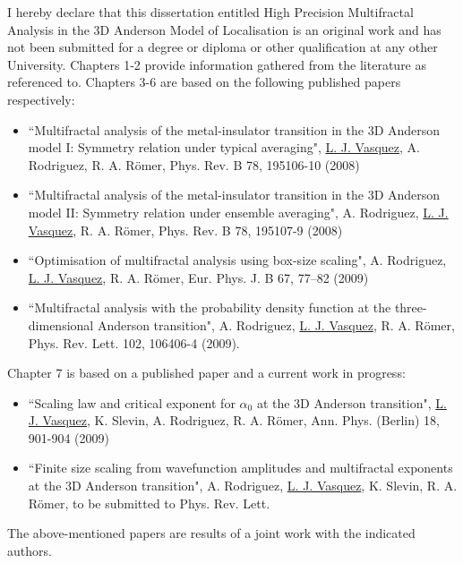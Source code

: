 \begin{singlespacing}
 
I hereby declare that this dissertation entitled High Precision Multifractal Analysis in the 3D Anderson Model of Localisation is an original work and has not been submitted for a degree or diploma or other qualification at any other University. 
%
Chapters 1-2 provide information gathered from the literature as referenced to.
%
Chapters 3-6 are based on the following published papers respectively:
%
\begin{itemize}
\item 
``Multifractal analysis of the metal-insulator transition in the 3D Anderson model I: Symmetry relation under typical averaging",
\underline{L. J. Vasquez}, A. Rodriguez, R. A. R\"{o}mer,
Phys. Rev. B 78, 195106-10 (2008)
\item 
``Multifractal analysis of the metal-insulator transition in the 3D Anderson model II: Symmetry relation under ensemble averaging",
A. Rodriguez, \underline{L. J. Vasquez}, R. A. R\"{o}mer,
Phys. Rev. B 78, 195107-9 (2008)
\item 
``Optimisation of multifractal analysis using box-size scaling",
A. Rodriguez, \underline{L. J. Vasquez}, R. A. R\"{o}mer,
Eur. Phys. J. B 67, 77–82 (2009)
\item
``Multifractal analysis with the probability density function at the three-dimensional Anderson transition",
A. Rodriguez, \underline{L. J. Vasquez}, R. A. R\"{o}mer,
Phys. Rev. Lett. 102, 106406-4 (2009).
\end{itemize}
%
Chapter 7 is based on a published paper and a current work in progress:
\begin{itemize}
\item
``Scaling law and critical exponent for $\alpha_0$ at the 3D Anderson transition",
\underline{L. J. Vasquez}, K. Slevin, A. Rodriguez, R. A. R\"{o}mer,
Ann. Phys. (Berlin) 18, 901-904 (2009)
\item
``Finite size scaling from wavefunction amplitudes and multifractal exponents at the 3D Anderson transition",
A. Rodriguez, \underline{L. J. Vasquez}, K. Slevin, R. A. R\"{o}mer,
to be submitted to Phys. Rev. Lett.
\end{itemize}
%
The above-mentioned papers are results of a joint work with the indicated authors.

\end{singlespacing}